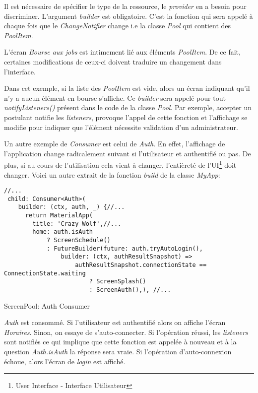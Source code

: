 Il est nécessaire de spécifier le type de la ressource, le \textit{provider} en a besoin pour discriminer. L'argument \textit{builder} est obligatoire. C'est la fonction qui sera appelé à chaque fois que le \textit{ChangeNotifier} change i.e la classe \textit{Pool} qui contient des \textit{PoolItem}. 

L'écran \textit{Bourse aux jobs} est intimement lié aux éléments \textit{PoolItem}. De ce fait, certaines modifications de ceux-ci doivent traduire un changement dans l'interface. 

Dans cet exemple, si la liste des \textit{PoolItem} est vide, alors un écran indiquant qu'il n'y a aucun élément en bourse s'affiche. Ce \textit{builder} sera appelé pour tout \textit{notifyListeners()} présent dans le code de la classe \textit{Pool}. Par exemple, accepter un postulant notifie les \textit{listeners}, provoque l'appel de cette fonction et l'affichage se modifie pour indiquer que l'élément nécessite validation d'un administrateur.

Un autre exemple de \textit{Consumer} est celui de \textit{Auth}. En effet, l'affichage de l'application change radicalement suivant si l'utilisateur et authentifié ou pas. De plus, si au cours de l'utilisation cela vient à changer, l'entièreté de l'UI\footnote{User Interface - Interface Utilisateur} doit changer. Voici un autre extrait de la fonction \textit{build} de la classe \textit{MyApp}:

\begin{listing}[!h]
\begin{verbatim}
//...
 child: Consumer<Auth>(
    builder: (ctx, auth, _) {//...
      return MaterialApp(
        title: 'Crazy Wolf',//...
        home: auth.isAuth
            ? ScreenSchedule()
            : FutureBuilder(future: auth.tryAutoLogin(),
                builder: (ctx, authResultSnapshot) =>
                    authResultSnapshot.connectionState == ConnectionState.waiting
                        ? ScreenSplash()
                        : ScreenAuth(),), //...
\end{verbatim}
\caption{ScreenPool: Auth Consumer}
\label{code:authConsumer}
\end{listing}

\textit{Auth} est consommé. Si l'utilisateur est authentifié alors on affiche l'écran \textit{Horaires}. Sinon, on essaye de s'auto-connecter. Si l'opération réussi, les \textit{listeners} sont notifiés ce qui implique que cette fonction est appelée à nouveau et à la question \textit{Auth.isAuth} la réponse sera vraie. Si l'opération d'auto-connexion échoue, alors l'écran de \textit{login} est affiché.

